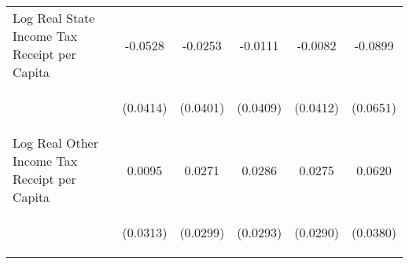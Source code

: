 \begin{center}
\begin{tabular}{lccccc}
\noalign{\smallskip}Log Real State Income Tax Receipt per Capita & \begin{scriptsize}-0.0528\end{scriptsize} & \begin{scriptsize}-0.0253\end{scriptsize} & \begin{scriptsize}-0.0111\end{scriptsize} & \begin{scriptsize}-0.0082\end{scriptsize} & \begin{scriptsize}-0.0899\end{scriptsize}\\
 & \begin{scriptsize}(0.0414)\end{scriptsize} & \begin{scriptsize}(0.0401)\end{scriptsize} & \begin{scriptsize}(0.0409)\end{scriptsize} & \begin{scriptsize}(0.0412)\end{scriptsize} & \begin{scriptsize}(0.0651)\end{scriptsize}\\
\noalign{\smallskip}Log Real Other Income Tax Receipt per Capita & \begin{scriptsize}0.0095\end{scriptsize} & \begin{scriptsize}0.0271\end{scriptsize} & \begin{scriptsize}0.0286\end{scriptsize} & \begin{scriptsize}0.0275\end{scriptsize} & \begin{scriptsize}0.0620\end{scriptsize}\\
 & \begin{scriptsize}(0.0313)\end{scriptsize} & \begin{scriptsize}(0.0299)\end{scriptsize} & \begin{scriptsize}(0.0293)\end{scriptsize} & \begin{scriptsize}(0.0290)\end{scriptsize} & \begin{scriptsize}(0.0380)\end{scriptsize}\\

\end{tabular}
\end{center}
